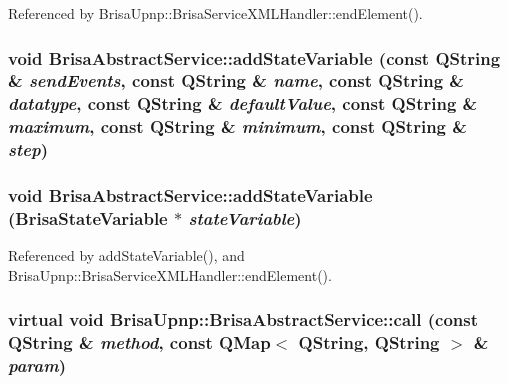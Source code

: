 Referenced by BrisaUpnp::BrisaServiceXMLHandler::endElement().\hypertarget{classBrisaUpnp_1_1BrisaAbstractService_a6a43f76000d4e9a35f38cfa1b6505bd0}{
\subsubsection[{addStateVariable}]{\setlength{\rightskip}{0pt plus 5cm}void BrisaAbstractService::addStateVariable (const QString \& {\em sendEvents}, \/  const QString \& {\em name}, \/  const QString \& {\em datatype}, \/  const QString \& {\em defaultValue}, \/  const QString \& {\em maximum}, \/  const QString \& {\em minimum}, \/  const QString \& {\em step})}}
\label{classBrisaUpnp_1_1BrisaAbstractService_a6a43f76000d4e9a35f38cfa1b6505bd0}
\hypertarget{classBrisaUpnp_1_1BrisaAbstractService_aa60cf051ff332d06991c9e394f75b372}{
\subsubsection[{addStateVariable}]{\setlength{\rightskip}{0pt plus 5cm}void BrisaAbstractService::addStateVariable ({\bf BrisaStateVariable} $\ast$ {\em stateVariable})}}
\label{classBrisaUpnp_1_1BrisaAbstractService_aa60cf051ff332d06991c9e394f75b372}


Referenced by addStateVariable(), and BrisaUpnp::BrisaServiceXMLHandler::endElement().\hypertarget{classBrisaUpnp_1_1BrisaAbstractService_ade3461839c097933b60f5b8d8fba7290}{
\subsubsection[{call}]{\setlength{\rightskip}{0pt plus 5cm}virtual void BrisaUpnp::BrisaAbstractService::call (const QString \& {\em method}, \/  const QMap$<$ QString, QString $>$ \& {\em param})}}
\label{classBrisaUpnp_1_1BrisaAbstractService_ade3461839c097933b60f5b8d8fba7290}


